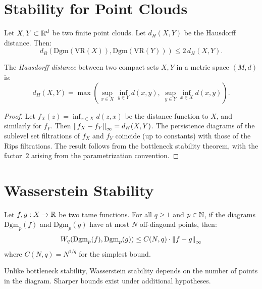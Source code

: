 \section{Stability for Point Clouds}

\begin{corollary}
Let $X, Y \subset \mathbb{R}^d$ be two finite point clouds. Let $d_H(X, Y)$
be the Hausdorff distance. Then:
\[
  d_B(\mathrm{Dgm}(\mathrm{VR}(X)), \mathrm{Dgm}(\mathrm{VR}(Y)))
  \leq 2\, d_H(X, Y).
\]
\end{corollary}

\begin{definition}
The \emph{Hausdorff distance} between two compact sets $X, Y$ in a
metric space $(M, d)$ is:
\[
  d_H(X, Y) = \max\left(
    \sup_{x \in X} \inf_{y \in Y} d(x, y),\;
    \sup_{y \in Y} \inf_{x \in X} d(x, y)
  \right).
\]
\end{definition}

\begin{proof}
Let $f_X(z) = \inf_{x \in X} d(z, x)$ be the distance function to $X$,
and similarly for $f_Y$. Then
$\left\| f_X - f_Y \right\|_\infty = d_H(X, Y)$.
The persistence diagrams of the sublevel set filtrations of $f_X$ and
$f_Y$ coincide (up to constants) with those of the Rips filtrations.
The result follows from the bottleneck stability theorem, with the
factor~$2$ arising from the parametrization convention.
\end{proof}

\section{Wasserstein Stability}

\begin{theorem}
Let $f, g : X \to \mathbb{R}$ be two tame functions. For all $q \geq 1$ and
$p \in \mathbb{N}$, if the diagrams $\mathrm{Dgm}_p(f)$ and
$\mathrm{Dgm}_p(g)$ have at most $N$ off-diagonal points, then:
\[
  W_q(\mathrm{Dgm}_p(f), \mathrm{Dgm}_p(g))
  \leq C(N, q) \cdot \left\| f - g \right\|_\infty
\]
where $C(N, q) = N^{1/q}$ for the simplest bound.
\end{theorem}

\begin{remark}
Unlike bottleneck stability, Wasserstein stability depends on the
number of points in the diagram. Sharper bounds exist under additional
hypotheses.
\end{remark}


